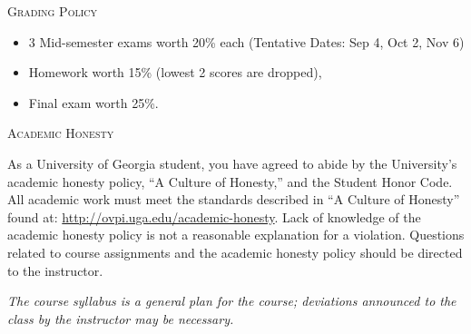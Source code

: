 \documentclass[12pt]{amsart}
\begin{document}
\medskip

\noindent
\textsc{Grading Policy}

\begin{itemize}
\item
3 Mid-semester exams worth 20\% each (Tentative Dates: Sep 4, Oct 2, Nov 6)
\item
Homework worth 15\% (lowest 2
scores are dropped), 
\item
Final exam worth 25\%.
\end{itemize}

\medskip

\noindent
\textsc{Academic Honesty}

As a University of Georgia student, you have agreed to abide by the
University’s academic honesty policy, “A Culture of Honesty,” and the
Student Honor Code.  All academic work must meet the standards described in
“A Culture of Honesty” found at:
\url{http://ovpi.uga.edu/academic-honesty}.  Lack of knowledge of the
academic honesty policy is not a reasonable explanation for a violation.
Questions related to course assignments and the academic honesty policy
should be directed to the instructor.



\smallskip

\textit{The course syllabus is a general plan for the course; deviations
announced to the class by 
the instructor may be necessary.}
\end{document}

